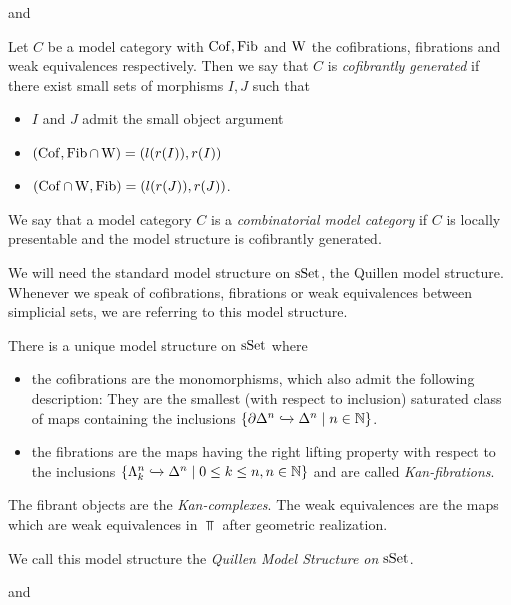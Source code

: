 \begin{reference}
    \cite[Theorem 2.1.14]{hovey2007model} and \cite[Proposition 2.1.5]{cisinski_2019}
\end{reference}
\begin{definition}
    Let $C$ be a model category with $\operatorname{Cof},\operatorname{Fib}$ and $\operatorname{W}$ the cofibrations, fibrations and weak equivalences respectively.
    Then we say that $C$ is \emph{cofibrantly generated} if there exist small sets of morphisms $I,J$ such that
    \begin{itemize}
        \item $I$ and $J$ admit the small object argument
        \item $(\operatorname{Cof},\operatorname{Fib}\cap\operatorname{W})=(l(r(I)),r(I))$
        \item $(\operatorname{Cof}\cap\operatorname{W},\operatorname{Fib})=(l(r(J)),r(J))$.
    \end{itemize} 
\end{definition}
\begin{definition}
    We say that a model category $C$ is a \emph{combinatorial model category} if $C$ is locally presentable and the model structure is cofibrantly generated.
\end{definition} %
We will need the standard model structure on $\sSet$, the Quillen model structure. 
Whenever we speak of cofibrations, fibrations or weak equivalences between simplicial sets, we are referring to this model structure.
\begin{thm}[Quillen Model Structure on $\sSet$] %
    There is a unique model structure on $\sSet$ where 
    \begin{itemize}
        \item the cofibrations are the monomorphisms, which also admit the following description: 
        They are the smallest (with respect to inclusion) saturated class of maps containing the inclusions $\left\lbrace\partial\Delta^n\xhookrightarrow{}\Delta^n\mid n\in\mathbb{N}\right\rbrace$.
        \item the fibrations are the maps having the right lifting property with respect to the inclusions $\left\lbrace\Lambda_k^n\xhookrightarrow{}\Delta^n\mid 0\leq k\leq n, n\in\mathbb{N}\right\rbrace$ and are called \emph{Kan-fibrations}.
    \end{itemize}
    The fibrant objects are the \emph{Kan-complexes}.
    The weak equivalences are the maps which are weak equivalences in $\Top$ after geometric realization.

    We call this model structure the \emph{Quillen Model Structure on $\sSet$}.
    \begin{reference}
        \cite[Theorem 3.1.8 and Theorem 3.1.29]{cisinski_2019} and \cite[Chap. II, \S 3, Theorem 1]{Quillen1967}
    \end{reference}
\end{thm}
